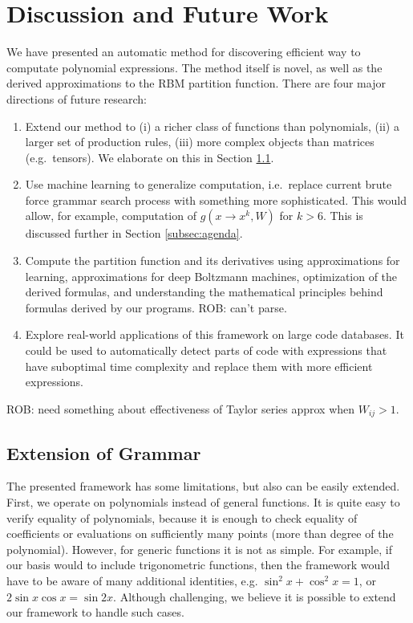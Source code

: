 \section{Discussion and Future Work}

We have presented an automatic method for discovering efficient way to
computate polynomial expressions. The method itself is novel, as well as the derived
approximations to the RBM partition function. There are four
major directions of future research: 

\begin{enumerate}
  \item Extend our method to (i) a richer class of functions
    than polynomials, (ii) a larger set of production rules, (iii) more complex
    objects than matrices (e.g.~tensors). We elaborate on this in
    Section \ref{sec:extend}.

  \item Use machine learning to generalize computation, i.e.~replace 
    current brute force grammar search process with something more
    sophisticated. This would allow, for example, computation of
$g(x \rightarrow x^k, W)$ for $k > 6$. This is discussed further in
Section \ref{subsec:agenda}.


\item Compute the partition function and its derivatives using approximations for learning, 
  approximations for deep Boltzmann machines, optimization of the derived formulas, and understanding the
mathematical principles behind formulas derived by our programs. ROB:
can't parse.

\item Explore real-world applications of this framework on large code databases. 
  It could be used to automatically detect parts of code with expressions that have suboptimal 
  time complexity and replace them with more efficient expressions.
\end{enumerate}

ROB: need something about effectiveness of Taylor series approx when
$W_{ij} > 1$. 


\subsection{Extension of Grammar}
\label{sec:extend}
The presented framework has some limitations, but also can be easily extended. First,
we operate on polynomials instead of general functions. It is quite easy to verify
equality of polynomials, because it is enough to check equality of coefficients or
evaluations on sufficiently many points (more than degree of
the polynomial). However, for generic functions
it is not as simple. For example, if our basis would to include trigonometric functions, then the
framework would have to be aware of many additional identities,
e.g. $\sin^2{x} + \cos^2{x} = 1$, or $2\sin x \cos x = \sin
2x$. Although challenging, we believe it is possible to extend our
framework to handle such cases. 

